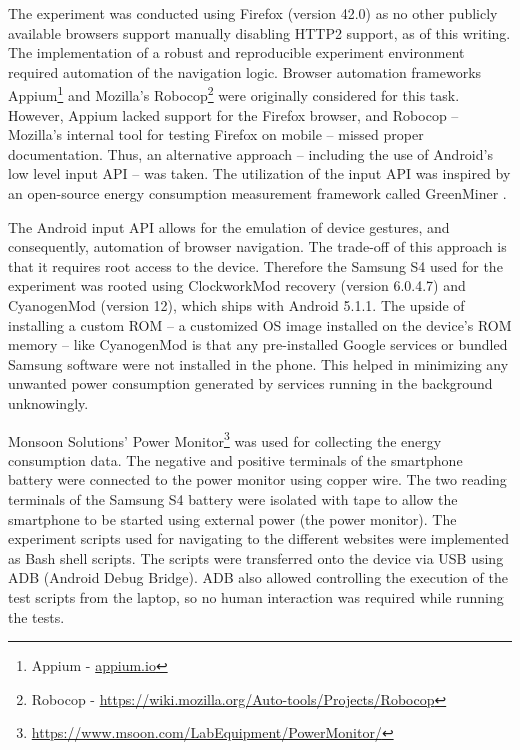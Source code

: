 \documentclass{article}
\begin{document}
The experiment was conducted using Firefox (version 42.0) as no other publicly available browsers support manually disabling HTTP2 support, as of this writing. The implementation of a robust and reproducible experiment environment required automation of the navigation logic. Browser automation frameworks Appium\footnote{Appium - \url{appium.io}} and Mozilla’s Robocop\footnote{Robocop - \url{https://wiki.mozilla.org/Auto-tools/Projects/Robocop}} were originally considered for this task. However, Appium lacked support for the Firefox browser, and Robocop -- Mozilla’s internal tool for testing Firefox on mobile -- missed proper documentation. Thus, an alternative approach -- including the use of Android’s low level input API -- was taken. The utilization of the input API was inspired by an open-source energy consumption measurement framework called GreenMiner \citep{greenminer}.

The Android input API allows for the emulation of device gestures, and consequently, automation of browser navigation. The trade-off of this approach is that it requires root access to the device. Therefore the Samsung S4 used for the experiment was rooted using ClockworkMod recovery (version 6.0.4.7) and CyanogenMod (version 12), which ships with Android 5.1.1. The upside of installing a custom ROM -- a customized OS image installed on the device's ROM memory -- like CyanogenMod is that any pre-installed Google services or bundled Samsung software were not installed in the phone. This helped in minimizing any unwanted power consumption generated by services running in the background unknowingly.

Monsoon Solutions' Power Monitor\footnote{\url{https://www.msoon.com/LabEquipment/PowerMonitor/}} was used for collecting the energy consumption data. The negative and positive terminals of the smartphone battery were connected to the power monitor using copper wire. The two reading terminals of the Samsung S4 battery were isolated with tape to allow the smartphone to be started using external power (the power monitor). The experiment scripts used for navigating to the different websites were implemented as Bash shell scripts. The scripts were transferred onto the device via USB using ADB (Android Debug Bridge). ADB also allowed controlling the execution of the test scripts from the laptop, so no human interaction was required while running the tests.
\end{document}
